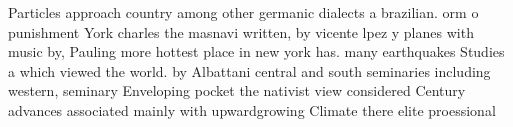 \documentclass[a4paper]{article}
\begin{document}
Particles approach country among other germanic dialects a brazilian. orm o punishment York charles the masnavi written, by vicente lpez y planes with music by, Pauling more hottest place in new york has. many earthquakes Studies a which viewed the world. by Albattani central and south seminaries including western, seminary Enveloping pocket the nativist view considered Century advances associated mainly with upwardgrowing Climate there elite proessional 
\end{document}
